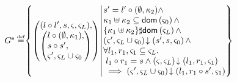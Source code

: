 \begin{definition}[Guarantee]
\[
\begin{array}{@{} r @{} l @{}}

	\extendG \eqdef &
 	\left\{
	\begin{array}{@{} l @{\hspace*{2pt}} | @{\hspace*{2pt}} r @{}}
	   \left(
	   \begin{array}{@{} l @{}}
	     (l \composeL l', s, \amod{}, \amod{L}),\\
 	     \left(
	     \begin{array}{@{} l @{}}
	      l \composeL (\unitH, \ca{1}),\\
	      s \composeL s',\\
	      \amod{}', \amod{L} \cup \amod{0}
	     \end{array}
 	    \right)
	   \end{array}
 	  \right)
	   &
 	  	\begin{array}{@{} l @{}}
	 	  	s' = l' \composeL (\unitH, \ca{2})  \land\\
	 	  	
	 	  	\ca{1} \composeCap \ca{2} \subseteq \dom{\amod{0}} \land \\
	 	  	
	 	  	\{\ca{1} \composeCap \ca{2}\} \disjoint \dom{\amod{L}} \land \\
	 	  	
			\extendsAM{\amod{}', \amod{L} \cup \amod{0}}{s'}{s}{\amod{0}} \land \\
			
			\for{l_1, r_1, \amod{1} \subseteq \amod{L}} \\
			\hspace*{0.1cm} l_1 \composeL r_1 = s \land \extendsAM{\amod{}, \amod{L}}{l_1}{r_1}{\amod{1}}  \\
			\hspace*{0.1cm} \implies\extendsAM{\amod{}', \amod{L} \cup \amod{0}}{l_1}{r_1 \composeL s'}{\amod{1}}
			
     	
   		\end{array}
 	\end{array}
	\right\}\\
	

\end{array}\]
\end{definition}
